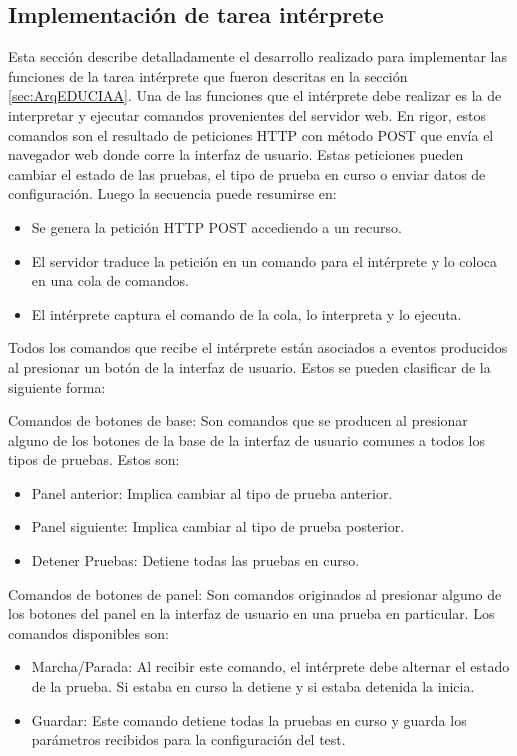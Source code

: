 \subsection{Implementación de tarea intérprete}
\label{sec:Interprete}
Esta sección describe detalladamente el desarrollo realizado para implementar las funciones de la tarea intérprete que fueron descritas en la sección \ref{sec:ArqEDUCIAA}.
Una de las funciones que el intérprete debe realizar es la de interpretar y ejecutar comandos provenientes del servidor web. En rigor, estos comandos son el resultado de peticiones HTTP con método POST que envía el navegador web donde corre la interfaz de usuario. Estas peticiones pueden cambiar el estado de las pruebas, el tipo de prueba en curso o enviar datos de configuración.
Luego la secuencia puede resumirse en:
\begin{itemize}
	\item Se genera la petición HTTP POST accediendo a un recurso.
	\item El servidor traduce la petición en un comando para el intérprete y lo coloca en una cola de comandos.
	\item El intérprete captura el comando de la cola, lo interpreta y lo ejecuta.
\end{itemize}

Todos los comandos que recibe el intérprete están asociados a eventos producidos al presionar un botón de la interfaz de usuario. Estos se pueden clasificar de la siguiente forma:

Comandos de botones de base: 
Son comandos que se producen al presionar alguno de los botones de la base de la interfaz de usuario comunes a todos los tipos de pruebas. Estos son:
\begin{itemize}
	\item Panel anterior: Implica cambiar al tipo de prueba anterior.
	\item Panel siguiente: Implica cambiar al tipo de prueba posterior.
	\item Detener Pruebas: Detiene todas las pruebas en curso.
\end{itemize}

Comandos de botones de panel:
Son comandos originados al presionar alguno de los botones del panel en la interfaz de usuario en una prueba en particular. Los comandos disponibles son:
\begin{itemize}
	\item Marcha/Parada: Al recibir este comando, el intérprete debe alternar el estado de la prueba. Si estaba en curso la detiene y si estaba detenida la inicia.
	\item Guardar: Este comando detiene todas la pruebas en curso y guarda los parámetros recibidos para la configuración del test.	
\end{itemize}

